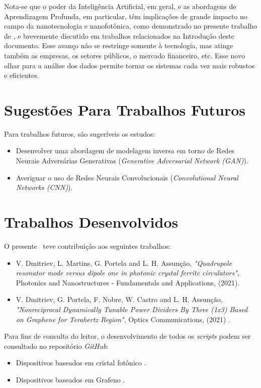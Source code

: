 Nota-se que o poder da Inteligência Artificial, em geral, e as abordagens de Aprendizagem Profunda, em particular, têm implicações de grande impacto no campo da nanotecnologia e nanofotônica, como demonstrado no presente trabalho de \textit\imprimirtitulo, e brevemente discutido em trabalhos relacionados na Introdução deste documento. Esse avanço não se restringe somente à tecnologia, mas atinge também as empresas, os setores públicos, o mercado financeiro, etc. Esse novo olhar para a análise dos dados permite tornar os sistemas cada vez mais robustos e eficientes.


\newpage
\section{Sugestões Para Trabalhos Futuros}

Para trabalhos futuros, são sugeríveis os estudos:

\begin{itemize}
    \item Desenvolver uma abordagem de modelagem inversa em torno de Redes Neurais Adversárias Generativas (\textit{Generative Adversarial Network (GAN)}).
    \item Averiguar o uso de Redes Neurais Convolucionais (\textit{Convolutional Neural Networks (CNN)}).
\end{itemize}


\section{Trabalhos Desenvolvidos}

O presente \imprimirtipotrabalho\ teve contribuição aos seguintes trabalhos:

\begin{itemize}
    \item V. Dmitriev, L. Martins, G. Portela and L. H. Assunção, \textit{"Quadrupole resonator mode versus dipole one in photonic crystal ferrite circulators"}, Photonics and Nanostructures - Fundamentals and Applications, (2021). \cite{DMITRIEV2021100954}
    \item V. Dmitriev, G. Portela, F. Nobre, W. Castro and L. H. Assunção, \textit{"Nonreciprocal Dynamically Tunable Power Dividers By Three (1x3) Based on Graphene for Terahertz Region"}, Optics Communications, (2021) \cite{Dmitriev2021Nonreciprocal}.
\end{itemize}

Para fins de consulta do leitor, o desenvolvimento de todos os \textit{scripts} podem ser consultado no repositório \textit{GitHub}:

\begin{itemize}
    \item Dispositivos baseados em cristal fotônico \cite{luizheinrich2021PhC}.
    \item Dispositivos baseados em Grafeno \cite{luizheinrich2021Graphene}.
\end{itemize}
